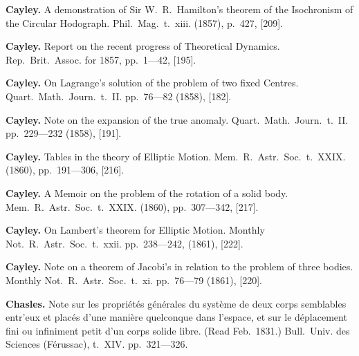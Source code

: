 \documentclass[11pt,a4paper]{book}
\begin{document}
\vspace{0.5em}

\noindent\textbf{Cayley.} A demonstration of Sir W.~R.~Hamilton's theorem of the Isochronism of the Circular Hodograph. Phil.~Mag.~t.~xiii. (1857), p.~427, [209].

\vspace{0.5em}

\noindent\textbf{Cayley.} Report on the recent progress of Theoretical Dynamics. Rep.~Brit.~Assoc. for 1857, pp.~1---42, [195].

\vspace{0.5em}

\noindent\textbf{Cayley.} On Lagrange's solution of the problem of two fixed Centres. Quart.~Math.~Journ.~t.~II. pp.~76---82 (1858), [182].

\vspace{0.5em}

\noindent\textbf{Cayley.} Note on the expansion of the true anomaly. Quart.~Math.~Journ.~t.~II. pp.~229---232 (1858), [191].

\vspace{0.5em}

\noindent\textbf{Cayley.} Tables in the theory of Elliptic Motion. Mem.~R.~Astr.~Soc.~t.~XXIX. (1860), pp.~191---306, [216].

\vspace{0.5em}

\noindent\textbf{Cayley.} A Memoir on the problem of the rotation of a solid body. Mem.~R.~Astr.~Soc.~t.~XXIX. (1860), pp.~307---342, [217].

\vspace{0.5em}

\noindent\textbf{Cayley.} On Lambert's theorem for Elliptic Motion. Monthly Not.~R.~Astr.~Soc.~t.~xxii. pp.~238---242, (1861), [222].

\vspace{0.5em}

\noindent\textbf{Cayley.} Note on a theorem of Jacobi's in relation to the problem of three bodies. Monthly Not.~R.~Astr.~Soc.~t.~xi. pp.~76---79 (1861), [220].

\vspace{0.5em}

\noindent\textbf{Chasles.} Note sur les propri\'{e}t\'{e}s g\'{e}n\'{e}rales du syst\`{e}me de deux corps semblables entr'eux et plac\'{e}s d'une mani\`{e}re quelconque dans l'espace, et sur le d\'{e}placement fini ou infiniment petit d'un corps solide libre. (Read Feb.~1831.) Bull.~Univ. des Sciences (F\'{e}russac), t.~XIV. pp.~321---326.
\end{document}
